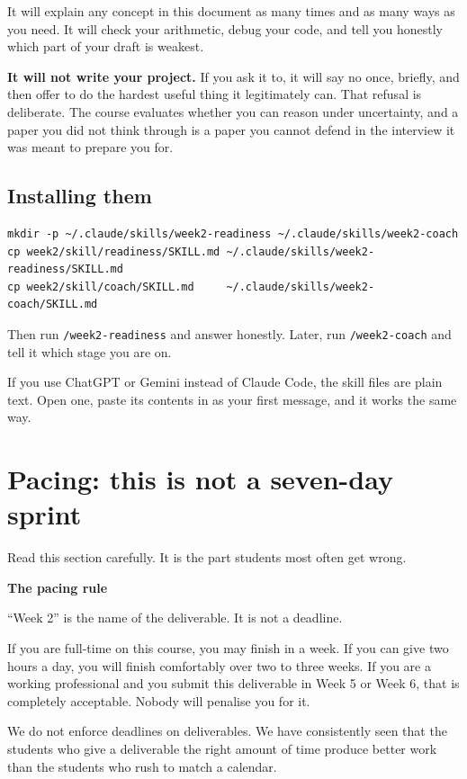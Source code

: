 \documentclass[11pt,a4paper]{article}
\newcommand{\boxtitle}[1]{{\bfseries #1}\par\vspace{2pt}}
\begin{document}
It will explain any concept in this document as many times and as many ways as you need. It will
check your arithmetic, debug your code, and tell you honestly which part of your draft is weakest.

\textbf{It will not write your project.} If you ask it to, it will say no once, briefly, and then
offer to do the hardest useful thing it legitimately can. That refusal is deliberate. The course
evaluates whether you can reason under uncertainty, and a paper you did not think through is a
paper you cannot defend in the interview it was meant to prepare you for.

\subsection{Installing them}

\begin{verbatim}
mkdir -p ~/.claude/skills/week2-readiness ~/.claude/skills/week2-coach
cp week2/skill/readiness/SKILL.md ~/.claude/skills/week2-readiness/SKILL.md
cp week2/skill/coach/SKILL.md     ~/.claude/skills/week2-coach/SKILL.md
\end{verbatim}

Then run \texttt{/week2-readiness} and answer honestly. Later, run \texttt{/week2-coach} and tell
it which stage you are on.

If you use ChatGPT or Gemini instead of Claude Code, the skill files are plain text. Open one,
paste its contents in as your first message, and it works the same way.

\section{Pacing: this is not a seven-day sprint}
\label{sec:pacing}

Read this section carefully. It is the part students most often get wrong.

\begin{sbbox}
\boxtitle{The pacing rule}
``Week 2'' is the name of the deliverable. It is not a deadline.

If you are full-time on this course, you may finish in a week. If you can give two hours a
day, you will finish comfortably over two to three weeks. If you are a working professional
and you submit this deliverable in Week 5 or Week 6, that is completely acceptable. Nobody
will penalise you for it.

We do not enforce deadlines on deliverables. We have consistently seen that the students who
give a deliverable the right amount of time produce better work than the students who rush to
match a calendar.
\end{sbbox}
\end{document}
